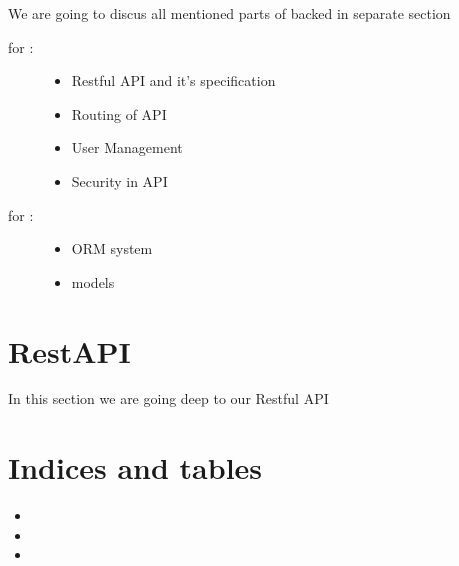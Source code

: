 \documentclass[letterpaper,10pt,english]{sphinxmanual}
\begin{document}
We are going to discus all mentioned parts of backed in separate section
\begin{description}
\item[{for :}] \leavevmode\begin{itemize}
\item {} 
Restful API and it’s specification

\item {} 
Routing of API

\item {} 
User Management

\item {} 
Security in API

\end{itemize}

\item[{for :}] \leavevmode\begin{itemize}
\item {} 
ORM system

\item {} 
models

\end{itemize}

\end{description}


\chapter{RestAPI}
\label{\detokenize{RestAPI:restapi}}\label{\detokenize{RestAPI::doc}}
In this section we are going deep to our Restful API


\chapter{Indices and tables}
\label{\detokenize{index:indices-and-tables}}\begin{itemize}
\item {} 

\item {} 

\item {} 

\end{itemize}



\renewcommand{\indexname}{Index}
\printindex
\end{document}
